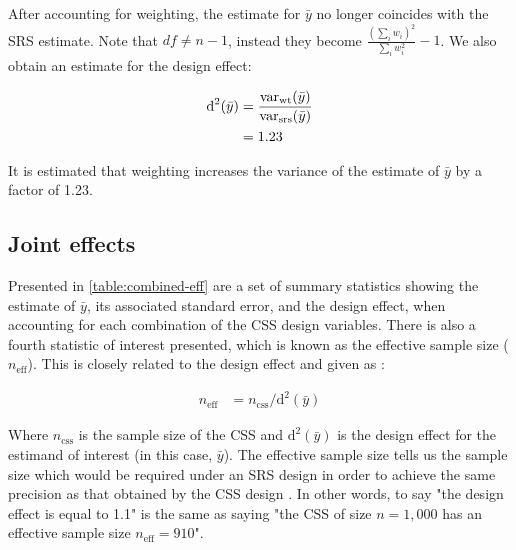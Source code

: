 After accounting for weighting, the estimate for $\bar{y}$ no longer coincides with the SRS estimate. Note that $df \neq n - 1$, instead they become $\frac{ (\sum_{i} w_{i})^{2} }{ \sum_{i} w_{i}^{2} } - 1$.  We also obtain an estimate for the design effect:

\begin{align}
\label{eq:wt-deff}
\notag
\text{d}^{2}(\bar{y})			&=		\frac{\text{var}_{\text{wt}}(\bar{y})}{\text{var}_{\text{srs}}(\bar{y})}	\\
\notag
						&=		1.23													
\end{align}

It is estimated that weighting increases the variance of the estimate of $\bar{y}$ by a factor of 1.23.

\subsection{Joint effects}

Presented in \autoref{table:combined-eff} are a set of summary statistics showing the estimate of $\bar{y}$, its associated standard error, and the design effect, when accounting for each combination of the CSS design variables. There is also a fourth statistic of interest presented, which is known as the effective sample size ($n_{\text{eff}}$). This is closely related to the design effect and given as \citep{heeringa2017}:

\begin{align}
n_{\text{eff}}				&=		n_{\text{css}} / \text{d}^{2}(\bar{y})
\end{align}

Where $n_{\text{css}}$ is the sample size of the CSS and $\text{d}^{2}(\bar{y})$ is the design effect for the estimand of interest (in this case, $\bar{y}$). The effective sample size tells us the sample size which would be required under an SRS design in order to achieve the same precision as that obtained by the CSS design \citep{heeringa2017}. In other words, to say "the design effect is equal to 1.1" is the same as saying "the CSS of size $n = 1,000$ has an effective sample size $n_{\text{eff}} = 910$".


